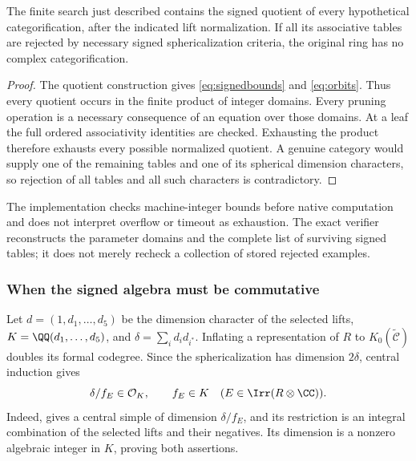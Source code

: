 \begin{proposition}\label{prop:oriented}
The finite search just described contains the signed quotient of every
hypothetical categorification, after the indicated lift normalization.
If all its associative tables are rejected by necessary signed
sphericalization criteria, the original ring has no complex
categorification.
\end{proposition}
\begin{proof}
The quotient construction gives \eqref{eq:signedbounds} and
\eqref{eq:orbits}. Thus every quotient occurs in the finite product of
integer domains. Every pruning operation is a necessary consequence of
an equation over those domains. At a leaf the full ordered associativity
identities are checked. Exhausting the product therefore exhausts every
possible normalized quotient. A genuine category would supply one of
the remaining tables and one of its spherical dimension characters, so
rejection of all tables and all such characters is contradictory.
\end{proof}

The implementation checks machine-integer bounds before native
computation and does not interpret overflow or timeout as exhaustion.
The exact verifier reconstructs the parameter domains and the complete
list of surviving signed tables; it does not merely recheck a collection
of stored rejected examples.

\subsubsection{When the signed algebra must be commutative}
Let $d=(1,d_1,\ldots,d_5)$ be the dimension character of the selected
lifts, $K=\QQ(d_1,\ldots,d_5)$, and
$\delta=\sum_i d_i d_{i^*}$. Inflating a representation of $R$ to
$K_0(\widetilde{\mathcal C})$ doubles its formal codegree. Since the
sphericalization has dimension $2\delta$, central induction gives
\begin{equation}\label{eq:fieldconstraint}
 \delta/f_E\in\mathcal O_K,\qquad f_E\in K
 \quad(E\in\Irr(R\otimes\CC)).
\end{equation}
Indeed, \cite[Theorem~2.13]{Ostrik3} gives a central simple of dimension
$\delta/f_E$, and its restriction is an integral combination of the
selected lifts and their negatives. Its dimension is a nonzero algebraic
integer in $K$, proving both assertions.

